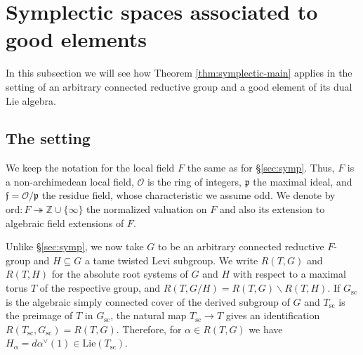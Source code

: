 \documentclass{article}
\def\mf#1{\mathfrak{#1}}
\def\tx#1{\textrm{#1}}
\def\cO{\mathcal{O}}
\newcommand{\bZ}{\mathbb{Z}}
\theoremstyle{definition}
\numberwithin{equation}{subsection}
\renewcommand{\-}{\hyp{}}
\newcommand{\rf}{\mathfrak{f}}
\begin{document}
	











\section{Symplectic spaces associated to good elements}
\label{sec:symplectictopadic}



In this subsection we will see how Theorem \ref{thm:symplectic-main} applies in the setting of an arbitrary connected reductive group and a good element of its dual Lie algebra. 

\subsection{The setting}
We keep the notation for the local field $F$ the same as for \S\ref{sec:symp}. Thus, $F$ is a non-archimedean local field, $\cO$ is the ring of integers, $\mf{p}$ the maximal ideal, and $\rf=\cO/\mf{p}$ the residue field, whose characteristic we assume odd. We denote by $\mathrm{ord}: F \twoheadrightarrow \bZ \cup \{\infty\}$ the normalized valuation on $F$ and also its extension to algebraic field extensions of $F$.

Unlike \S\ref{sec:symp}, we now take $G$ to be an arbitrary connected reductive $F$-group and $H \subseteq G$ a tame twisted Levi subgroup. We write $R(T,G)$ and $R(T,H)$ for the absolute root systems of $G$ and $H$ with respect to a maximal torus $T$ of the respective group, and $R(T,G/H)=R(T,G) \smallsetminus R(T,H)$. If $G_\mathrm{sc}$ is the algebraic simply connected cover of the derived subgroup of $G$ and $T_\tx{sc}$ is the preimage of $T$ in $G_\tx{sc}$, the natural map $T_\tx{sc} \to T$ gives an identification $R(T_\tx{sc},G_\tx{sc})=R(T,G)$. Therefore, for $\alpha \in R(T,G)$ we have $H_\alpha=d\alpha^\vee(1) \in \tx{Lie}(T_\tx{sc})$.
\end{document}
